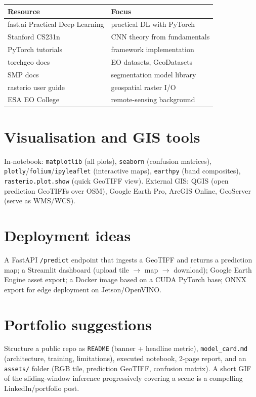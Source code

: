 \begin{center}\small
\renewcommand{\arraystretch}{1.15}
\begin{tabular}{@{}ll@{}}
\toprule
Resource & Focus\\
\midrule
fast.ai Practical Deep Learning & practical DL with PyTorch\\
Stanford CS231n & CNN theory from fundamentals\\
PyTorch tutorials & framework implementation\\
torchgeo docs & EO datasets, GeoDatasets\\
SMP docs & segmentation model library\\
rasterio user guide & geospatial raster I/O\\
ESA EO College & remote-sensing background\\
\bottomrule
\end{tabular}
\end{center}

\section{Visualisation and GIS tools}

In-notebook: \texttt{matplotlib} (all plots), \texttt{seaborn} (confusion
matrices), \texttt{plotly}/\texttt{folium}/\texttt{ipyleaflet} (interactive
maps), \texttt{earthpy} (band composites), \texttt{rasterio.plot.show} (quick
GeoTIFF view). External GIS: QGIS (open prediction GeoTIFFs over OSM), Google
Earth Pro, ArcGIS Online, GeoServer (serve as WMS/WCS).

\section{Deployment ideas}

A FastAPI \texttt{/predict} endpoint that ingests a GeoTIFF and returns a
prediction map; a Streamlit dashboard (upload tile $\to$ map $\to$ download);
Google Earth Engine asset export; a Docker image based on a CUDA PyTorch base;
ONNX export for edge deployment on Jetson/OpenVINO.

\section{Portfolio suggestions}

Structure a public repo as \texttt{README} (banner + headline metric),
\texttt{model\_card.md} (architecture, training, limitations), executed
notebook, 2-page report, and an \texttt{assets/} folder (RGB tile, prediction
GeoTIFF, confusion matrix). A short GIF of the sliding-window inference
progressively covering a scene is a compelling LinkedIn/portfolio post.

